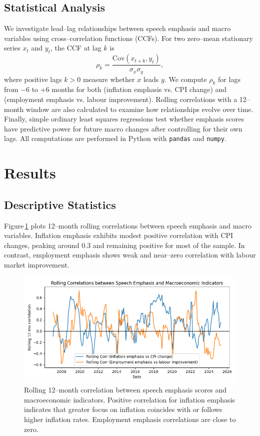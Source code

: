 \documentclass[sigconf]{acmart}
\begin{document}
\subsection{Statistical Analysis}
We investigate lead–lag relationships between speech emphasis and macro variables using cross–correlation functions (CCFs).  For two zero–mean stationary series \(x_{t}\) and \(y_{t}\), the CCF at lag \(k\) is
\begin{equation}
  \rho_{k} = \frac{\mathrm{Cov}(x_{t+k}, y_{t})}{\sigma_{x}\sigma_{y}},
\end{equation}
where positive lags \(k>0\) measure whether \(x\) leads \(y\).  We compute \(\rho_{k}\) for lags from \(-6\) to +6 months for both (inflation emphasis vs. CPI change) and (employment emphasis vs. labour improvement).  Rolling correlations with a 12–month window are also calculated to examine how relationships evolve over time.  Finally, simple ordinary least squares regressions test whether emphasis scores have predictive power for future macro changes after controlling for their own lags.  All computations are performed in Python with \texttt{pandas} and \texttt{numpy}.

\section{Results}

\subsection{Descriptive Statistics}
Figure\,\ref{fig:rollingcorr} plots 12–month rolling correlations between speech emphasis and macro variables.  Inflation emphasis exhibits modest positive correlation with CPI changes, peaking around 0.3 and remaining positive for most of the sample.  In contrast, employment emphasis shows weak and near–zero correlation with labour market improvement.

\begin{figure}[t]
  \centering
  \includegraphics[width=0.9\linewidth]{rolling_correlations.png}
  \caption{Rolling 12–month correlation between speech emphasis scores and macroeconomic indicators.  Positive correlation for inflation emphasis indicates that greater focus on inflation coincides with or follows higher inflation rates.  Employment emphasis correlations are close to zero.}
  \label{fig:rollingcorr}
\end{figure}
\end{document}

